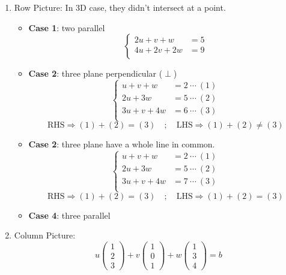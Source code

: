 \begin{enumerate}[label=(\arabic*)]
    \item Row Picture: In 3D case, they didn't intersect at a point.
    \begin{itemize}
        \item \textbf{Case 1}: two parallel
        \[
        \begin{cases}
        2u +v +w&=5\\
        4u+2v+2w &=9 \\
        \end{cases}
        \]
        
        \item \textbf{Case 2}: three plane perpendicular ($\perp$)
        \[
        \begin{cases}
        u +v +w&=2 \ \cdots\ (1)\\
        2u+3w &=5 \ \cdots\ (2)\\
        3u+v+4w &= 6\ \cdots\ (3)\\
        \end{cases}
        \]
        \[
        \text{RHS} \Rightarrow (1)+(2)=(3)\quad ;\quad
        \text{LHS} \Rightarrow (1)+(2)\neq(3)
        \]
        
        \item \textbf{Case 2}: three plane have a whole line in common.
        \[
        \begin{cases}
        u +v +w&=2 \ \cdots\ (1)\\
        2u+3w &=5 \ \cdots\ (2)\\
        3u+v+4w &= 7\ \cdots\ (3)\\
        \end{cases}
        \]
        \[
        \text{RHS} \Rightarrow (1)+(2)=(3)\quad ;\quad
        \text{LHS} \Rightarrow (1)+(2)=(3)
        \]
        \item \textbf{Case 4}: three parallel
    \end{itemize}

    \item Column Picture:
    \[
    u\left(\begin{matrix}
    1 \\2 \\3
    \end{matrix}\right) + 
    v\left(\begin{matrix}
    1 \\0 \\1
    \end{matrix}\right) +
    w\left(\begin{matrix}
    1 \\3 \\4
    \end{matrix}\right) = 
    b
    \]


\end{enumerate}

